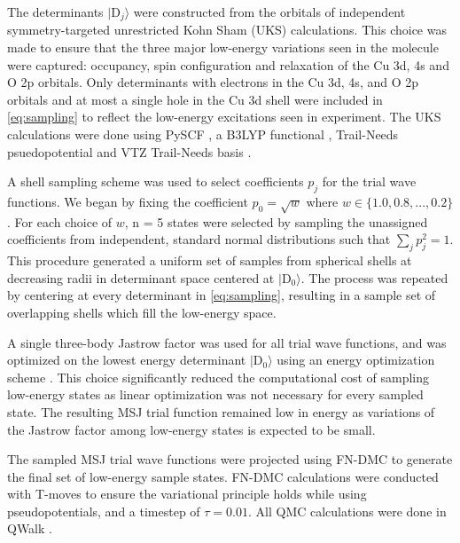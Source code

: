\documentclass[12pt]{article}
\begin{document}
The determinants $|\text{D}_j \rangle$ were constructed from the orbitals of independent symmetry-targeted unrestricted Kohn Sham (UKS) calculations.
This choice was made to ensure that the three major low-energy variations seen in the molecule were captured: occupancy, spin configuration and relaxation of the Cu 3d, 4s and O 2p orbitals.
Only determinants with electrons in the Cu 3d, 4s, and O 2p orbitals and at most a single hole in the Cu 3d shell were included in \eqref{eq:sampling} to reflect the low-energy excitations seen in experiment.
The UKS calculations were done using PySCF \cite{Sun2018}, a B3LYP functional \cite{doi:10.1063/1.464304, PhysRevB.37.785}, Trail-Needs psuedopotential and VTZ Trail-Needs basis \cite{doi:10.1063/1.4811651}.

A shell sampling scheme was used to select coefficients $p_j$ for the trial wave functions.
We began by fixing the coefficient $p_0 = \sqrt{w}$ where $w \in \{1.0, 0.8, ..., 0.2\}$. 
For each choice of $w$, n = 5 states were selected by sampling the unassigned coefficients from independent, standard normal distributions such that $\sum_j p_j^2 = 1$. 
This procedure generated a uniform set of samples from spherical shells at decreasing radii in determinant space centered at $|\text{D}_0\rangle$.
The process was repeated by centering at every determinant in \eqref{eq:sampling}, resulting in a sample set of overlapping shells which fill the low-energy space.

A single three-body Jastrow factor was used for all trial wave functions, and was optimized on the lowest energy determinant $|\text{D}_0 \rangle$ using an energy optimization scheme \cite{Toulouse2007}.
This choice significantly reduced the computational cost of sampling low-energy states as linear optimization was not necessary for every sampled state.
The resulting MSJ trial function remained low in energy as variations of the Jastrow factor among low-energy states is expected to be small.

The sampled MSJ trial wave functions were projected using FN-DMC to generate the final set of low-energy sample states.
FN-DMC calculations were conducted with T-moves \cite{PhysRevB.74.161102} to ensure the variational principle holds while using pseudopotentials, and a timestep of $\tau = 0.01$.
All QMC calculations were done in QWalk \cite{Wagner2009}.

\vspace{-10pt}
\end{document}
